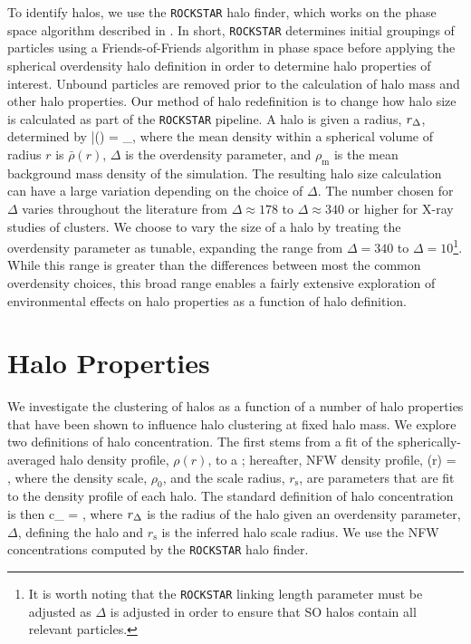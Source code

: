 \documentclass[usenatbib]{mnras}
\begin{document}
To identify halos, we use the {\tt ROCKSTAR} halo finder, which works on the phase space algorithm described in
\citet*{behroozi_etal13a}. In short, {\tt ROCKSTAR} determines initial groupings of particles using a Friends-of-Friends algorithm 
in phase space before applying the spherical overdensity halo definition in order to determine halo properties of
interest. Unbound particles are removed prior to the calculation of halo mass and other halo properties. Our
method of halo redefinition is to change how halo size is calculated as part of the {\tt ROCKSTAR} pipeline. A halo is
given a radius, $r_{\Delta}$, determined by
\beq
	\bar{\rho}(\Rdel) = \Delta \rho_{}, 
\eeq
where the mean density within a spherical volume of radius $r$ is $\bar{\rho}(r)$, $\Delta$ is the overdensity
parameter, and $\rho_{\mathrm{m}}$ is the mean background mass density of the simulation. The resulting
halo size calculation can have a large variation depending on the choice of $\Delta$. The number chosen for
$\Delta$ varies throughout the literature from $\Delta \approx 178$ to $\Delta \approx 340$ or higher for X-ray studies of 
clusters. We choose to vary the size of a halo by treating the overdensity parameter as tunable, expanding the range from 
$\Delta = 340$ to $\Delta = 10$\footnote{It is worth noting that the {\tt ROCKSTAR} linking length parameter must be adjusted 
as $\Delta$ is adjusted in order to ensure that SO halos contain all relevant particles.}. While this range is greater than the 
differences between most the common overdensity choices, this broad range enables a fairly extensive exploration of 
environmental effects on halo properties as a function of halo definition.


\section{Halo Properties}
\label{section:haloprops}

We investigate the clustering of halos as a function of a number of halo properties 
that have been shown to influence halo clustering at fixed halo mass. We explore 
two definitions of halo concentration. The first stems from a fit of the spherically-averaged 
halo density profile, $\rho(r)$, to a \citet{navarro_etal97}; hereafter, NFW density profile, 
%
\beq
\rho(r) = ,
\eeq
%
where the density scale, $\rho_0$, and the scale radius, $r_{\mathrm{s}}$, are parameters 
that are fit to the density profile of each halo. The standard definition of halo concentration is then 
\beq
c_{} = ,
\eeq
where $r_{\Delta}$ is the radius of the halo given an overdensity parameter, $\Delta$, defining the halo 
and $r_{\mathrm{s}}$ is the inferred halo scale radius. We use the NFW concentrations computed by the 
{\tt ROCKSTAR} halo finder.  
\end{document}
